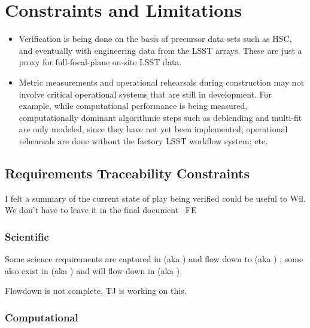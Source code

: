 \section{Constraints and Limitations}

\begin{itemize}

\item Verification is being done on the basis of precursor data sets such as HSC, and eventually with engineering data from the LSST arrays. These are just a proxy for full-focal-plane on-site LSST data.

\item Metric measurements and operational rehearsals during construction may not involve critical operational systems that are still in development. For example, while computational performance is being measured, computationally dominant algorithmic steps such as deblending and multi-fit are only modeled, since they have not yet been implemented; operational rehearsals are done without the factory LSST workflow system; etc.

\end{itemize}

\subsection{Requirements Traceability Constraints}

\begin{note}
  I felt a summary of the current state of play being verified could be useful to Wil. We don't have to leave it in the final document --FE
\end{note}

\subsubsection{Scientific}

Some science requirements are captured in  (aka \LSR) and  flow down to  (aka \OSS) ; some also exist in  (aka \DPDD) and will flow down in  (aka \DMSR).

\begin{note}
Flowdown is not complete, TJ is working on this.
\end{note}

\subsubsection{Computational}

